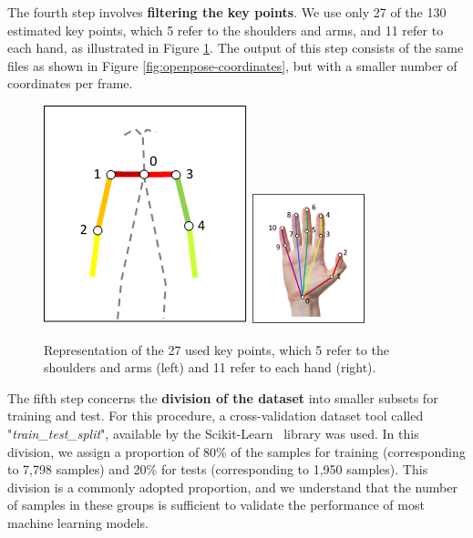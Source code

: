 
    
The fourth step involves \textbf{filtering the key points}. We use only 27 of the 130 estimated key points, which 5 refer to the shoulders and arms, and 11 refer to each hand, as illustrated in Figure \ref{fig:filtered-keypoints}. The output of this step consists of the same files as shown in Figure \ref{fig:openpose-coordinates}, but with a smaller number of coordinates per frame.

\begin{figure}[ht]
    \centering
    \includegraphics[width=3.5
    cm]{images/filtered_keypoints_body}
    \includegraphics[width=3.3cm]{images/filtered_keypoints_hand}
    \caption{Representation of the 27 used key points, which 5 refer to the shoulders and arms (left) and 11 refer to each hand (right).}
    \label{fig:filtered-keypoints}
\end{figure}


The fifth step concerns the \textbf{division of the dataset} into smaller subsets for training and test. For this procedure, a cross-validation dataset tool called "\textit{train\_test\_split}", available by the Scikit-Learn~\cite{scikit-learn} library was used. In this division, we assign a proportion of 80\% of the samples for training (corresponding to 7,798 samples) and 20\% for tests (corresponding to 1,950 samples). This division is a commonly adopted proportion, and we understand that the number of samples in these groups is sufficient to validate the performance of most machine learning models.

